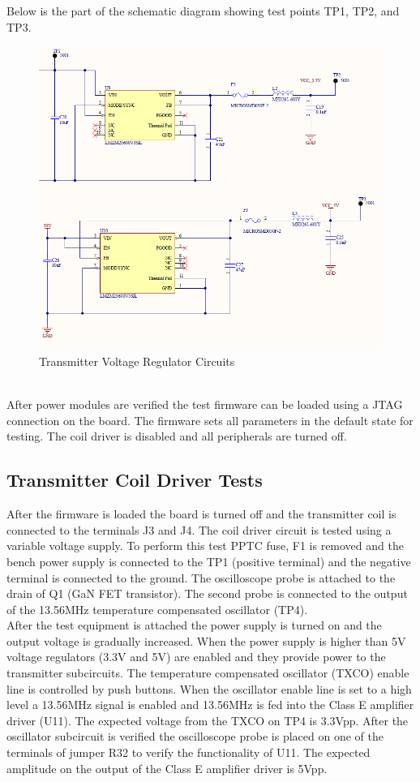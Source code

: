\documentclass[12pt]{article}
\begin{document}
\noindent
Below is the part of the schematic diagram showing test points TP1, TP2, and TP3.
\hfill
\begin{figure}[h!]
\centering
\includegraphics[width=0.82\linewidth]{Transmitter_power_supply_sch_diag}
\caption{Transmitter Voltage Regulator Circuits}
\end{figure}

\hfill \\
\indent
After power modules are verified the test firmware can be loaded using a JTAG connection on the board.  The firmware sets all parameters in the default state for testing. The coil driver is disabled and all peripherals are turned off.

\subsection{Transmitter Coil Driver Tests}
\indent
After the firmware is loaded the board is turned off and the transmitter coil is connected to the terminals J3 and J4. The coil driver circuit is tested using a variable voltage supply. To perform this test PPTC fuse, F1 is removed and the bench power supply is connected to the TP1 (positive terminal) and the negative terminal is connected to the ground.  The oscilloscope probe is attached to the drain of  Q1 (GaN FET transistor).  The second probe is connected to the output of the 13.56MHz temperature compensated oscillator (TP4).\\

\indent
After the test equipment is attached the power supply is turned on and the output voltage is gradually increased. When the power supply is higher than 5V voltage regulators (3.3V and 5V) are enabled and they provide power to the transmitter subcircuits.  The temperature compensated oscillator (TXCO) enable line is controlled by push buttons. When the oscillator enable line is set to a high level a 13.56MHz signal is enabled and 13.56MHz is fed into the Class E amplifier driver (U11). The expected voltage from the TXCO on TP4 is 3.3Vpp.  After the oscillator subcircuit is verified the oscilloscope probe is placed on one of the terminals of jumper R32 to verify the functionality of U11. The expected amplitude on the output of the Class E amplifier driver is 5Vpp.\\
\end{document}
